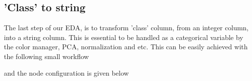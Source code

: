 \documentclass[11pt]{article}
\begin{document}
		\subsection*{'Class' to  string}
			The last step of our EDA, is to transform 'class' column, from an integer column, into a string column. This is essential to be handled as a categorical variable by the color manager, PCA, normalization and etc. This can be easily achieved with the following small workflow

			and the node configuration is given below

\end{document}
